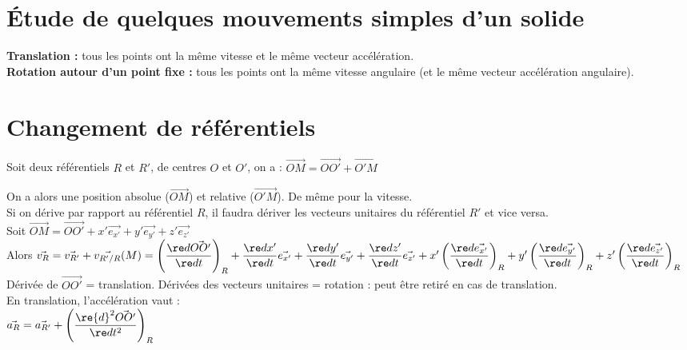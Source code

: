 \documentclass[13pt, twoside, a4paper, french]{report}
\begin{document}
        \section{Étude de quelques mouvements simples d’un solide}\label{sec:etude-de-quelques-mouvements-simples-dun-solide}

            \textbf{Translation :} tous les points ont la même vitesse et le même vecteur accélération.\\

            \textbf{Rotation autour d'un point fixe :} tous les points ont la même vitesse angulaire (et le même vecteur accélération angulaire).


        \section{Changement de référentiels}\label{sec:changement-de-referentiels}

            Soit deux référentiels $R$ et $R'$, de centres $O$ et $O'$, on a : $\vec{OM} = \vec{OO'} + \vec{O'M}$

            On a alors une position absolue ($\vec{OM}$) et relative ($\vec{O'M}$).
            De même pour la vitesse.\\

            Si on dérive par rapport au référentiel $R$, il faudra dériver les vecteurs unitaires du référentiel $R'$ et vice versa.\\

            Soit $\vec{OM} = \vec{OO'} + x' \vec{e_{x'}} + y' \vec{e_{y'}} + z' \vec{e_{z'}}$\\
            Alors $\vec{v_{R}} = \vec{v_{R'}} + \vec{v_{R'/R}}(M) = \left( \dfrac{\re d \vec{OO'}}{\re d t} \right)_R + \dfrac{\re d x'}{\re d t} \vec{e_{x'}} + \dfrac{\re d y'}{\re d t} \vec{e_{y'}} + \dfrac{\re d z'}{\re d t} \vec{e_{z'}} + x' \left( \dfrac{\re d \vec{e_{x'}}}{\re d t} \right)_R + y' \left( \dfrac{\re d \vec{e_{y'}}}{\re d t} \right)_R + z' \left( \dfrac{\re d \vec{e_{z'}}}{\re d t} \right)_R$\\

            Dérivée de $\vec{OO'}$ = translation.
            Dérivées des vecteurs unitaires = rotation : peut être retiré en cas de translation.\\
            En translation, l'accélération vaut :\\

            $\vec{a_R} = \vec{a_{R'}} + \left( \dfrac{\re{d}^2 \vec{OO'}}{\re d t^2} \right)_R$
\end{document}
